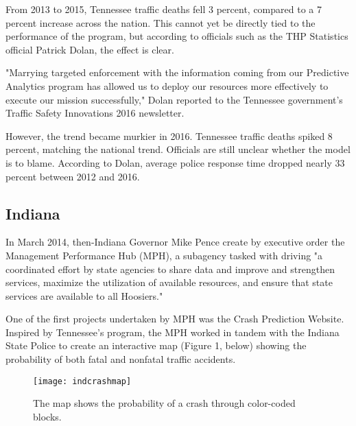 \documentclass[sigconf]{acmart}
\begin{document}
From 2013 to 2015, Tennessee traffic deaths fell 3 percent, compared to a 7 percent increase across the nation. This cannot yet be directly tied to the performance of the program, but according to officials such as the THP Statistics official Patrick Dolan, the effect is clear.

"Marrying targeted enforcement with the information coming from our Predictive Analytics program has allowed us to deploy our resources more effectively to execute our mission successfully," Dolan reported to the Tennessee government's Traffic Safety Innovations 2016 newsletter. \cite{tennessee}

However, the trend became murkier in 2016. Tennessee traffic deaths spiked 8 percent, matching the national trend. Officials are still unclear whether the model is to blame. According to Dolan, average police response time dropped nearly 33 percent between 2012 and 2016. \cite{pew}

\subsection{Indiana}
In March 2014, then-Indiana Governor Mike Pence create by executive order the Management Performance Hub (MPH), a subagency tasked with driving "a coordinated effort by state agencies to share data and improve and strengthen services, maximize the utilization of available resources, and ensure that state services are available to all Hoosiers."\cite{pence}

One of the first projects undertaken by MPH was the Crash Prediction Website. Inspired by Tennessee's program\cite{govtech}, the MPH worked in tandem with the Indiana State Police to create an interactive map (Figure 1, below) showing the probability of both fatal and nonfatal traffic accidents. 

\begin{figure}
\caption{The map shows the probability of a crash through color-coded blocks.\cite{indcrashmap}}
\texttt{[image: indcrashmap]}
\end{figure}
\end{document}

